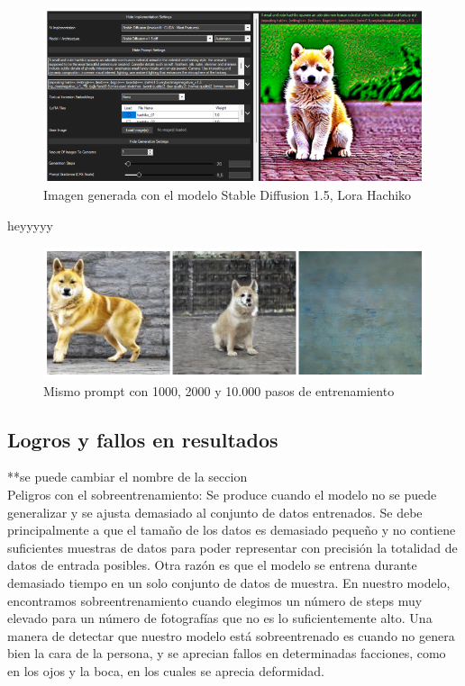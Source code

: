 \begin{figure}[!htb]
	\centering
	\includegraphics[width = 1
	\textwidth]{Imagenes/Vectorial/hachiko_detallada.png}
	\caption{Imagen generada con el modelo Stable Diffusion 1.5, Lora Hachiko}
	\label{fig:detallehachi}
\end{figure}

heyyyyy\\

\begin{figure}[!htb]
	\centering
	\includegraphics[width = 1
	\textwidth]{Imagenes/Vectorial/comparacion_hachiko.png}
	\caption{Mismo prompt con 1000, 2000 y 10.000 pasos de entrenamiento}
	\label{fig:comphachi}
\end{figure}

\subsection{Logros y fallos en resultados}
**se puede cambiar el nombre de la seccion \\


Peligros con el sobreentrenamiento: Se produce cuando el modelo no se puede generalizar y se ajusta demasiado al conjunto de datos entrenados. Se debe principalmente a que el tamaño de los datos es demasiado pequeño y no contiene suficientes muestras de datos para poder representar con precisión la totalidad de datos de entrada posibles. Otra razón es que el modelo se entrena durante demasiado tiempo en un solo conjunto de datos de muestra. En nuestro modelo, encontramos sobreentrenamiento cuando elegimos un número de steps muy elevado para un número de fotografías que no es lo suficientemente alto. Una manera de detectar que nuestro modelo está sobreentrenado es cuando no genera bien la cara de la persona, y se aprecian fallos en determinadas facciones, como en los ojos y la boca, en los cuales se aprecia deformidad.\\

